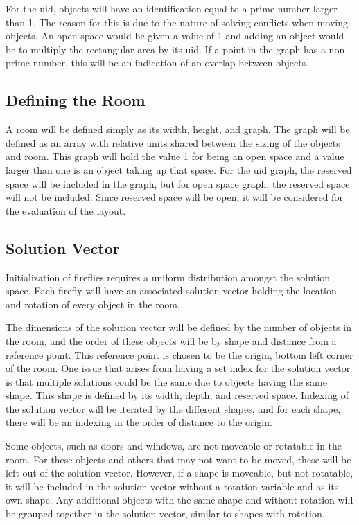 \documentclass[conference]{IEEEtran}
\begin{document}
    For the uid, objects will have an identification equal to a prime number larger than 1. The reason for this is due to the nature of solving conflicts when moving objects. An open space would be given a value of 1 and adding an object would be to multiply the rectangular area by its uid. If a point in the graph has a non-prime number, this will be an indication of an overlap between objects.
    

    \subsection{Defining the Room}
    A room will be defined simply as its width, height, and graph. The graph will be defined as an array with relative units shared between the sizing of the objects and room. This graph will hold the value 1 for being an open space and a value larger than one is an object taking up that space. For the uid graph, the reserved space will be included in the graph, but for open space graph, the reserved space will not be included. Since reserved space will be open, it will be considered for the evaluation of the layout.

    \subsection{Solution Vector}
    Initialization of fireflies requires a uniform distribution amongst the solution space. Each firefly will have an associated solution vector holding the location and rotation of every object in the room. 
    
    The dimensions of the solution vector will be defined by the number of objects in the room, and the order of these objects will be by shape and distance from a reference point. This reference point is chosen to be the origin, bottom left corner of the room. One issue that arises from having a set index for the solution vector is that multiple solutions could be the same due to objects having the same shape. This shape is defined by its width, depth, and reserved space. Indexing of the solution vector will be iterated by the different shapes, and for each shape, there will be an indexing in the order of distance to the origin.
    
    Some objects, such as doors and windows, are not moveable or rotatable in the room. For these objects and others that may not want to be moved, these will be left out of the solution vector. However, if a shape is moveable, but not rotatable, it will be included in the solution vector without a rotation variable and as its own shape. Any additional objects with the same shape and without rotation will be grouped together in the solution vector, similar to shapes with rotation.
    
\end{document}
